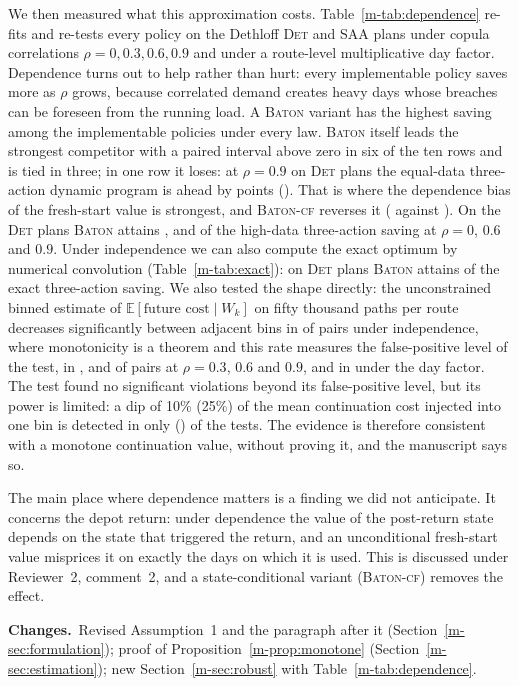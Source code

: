 \documentclass[11pt]{article}
\newcommand{\chg}{\par\noindent\textbf{Changes.}\ }
\newcommand{\sref}[1]{Section~\ref{m-#1}}
\newcommand{\tref}[1]{Table~\ref{m-#1}}
\newcommand{\BATON}{\textsc{Baton}}
\begin{document}
We then measured what this approximation costs. \tref{tab:dependence}
re-fits and re-tests every policy on the Dethloff \textsc{Det} and
\textsc{SAA} plans under copula correlations $\rho = 0, 0.3, 0.6, 0.9$
and under a route-level multiplicative day factor. Dependence turns out
to help rather than hurt: every implementable policy saves more as $\rho$ grows,
because correlated demand creates heavy days whose breaches can be
foreseen from the running load. A \BATON{} variant has the highest
saving among the implementable policies under every law. \BATON{}
itself leads the strongest competitor with a paired interval above zero
in six of the ten rows and is tied in three; in one row it loses: at
$\rho = 0.9$ on \textsc{Det} plans the equal-data three-action dynamic
program is ahead by \depRhoNineDetDelta{} points
(\depRhoNineDetDeltaCI). That is where the dependence bias of the
fresh-start value is strongest, and \textsc{Baton-cf} reverses it
(\depRhoNineDetCf{} against \depRhoNineDetCompSv). On the \textsc{Det}
plans \BATON{} attains \depRhoZeroDetRatio, \depRhoSixDetRatio{} and
\depRhoNineDetRatio{} of the high-data three-action saving at
$\rho = 0$, $0.6$ and $0.9$. Under independence we can also compute the
exact optimum by numerical convolution (\tref{tab:exact}): on
\textsc{Det} plans \BATON{} attains \exDetShare{} of the exact
three-action saving. We also tested the shape directly: the
unconstrained binned estimate of $\mathbb E[\text{future cost}\mid W_k]$
on fifty thousand paths per route decreases significantly between
adjacent bins in \shapeViolZero{} of pairs under independence, where
monotonicity is a theorem and this rate measures the false-positive
level of the test, in \shapeViolThree, \shapeViolSix{} and
\shapeViolNine{} of pairs at $\rho = 0.3$, $0.6$ and $0.9$, and in
\shapeViolDayfac{} under the day factor. The test found no significant
violations beyond its false-positive level, but its power is limited: a
dip of 10\% (25\%) of the mean continuation cost injected into one bin
is detected in only \shapePowTenAll{} (\shapePowTwentyFiveAll) of the
tests. The evidence is therefore consistent with a monotone continuation
value, without proving it, and the manuscript says so.

The main place where dependence matters is a finding we did not
anticipate. It concerns the depot return: under dependence the value of
the post-return state depends on the state that triggered the return,
and an unconditional fresh-start value misprices it on exactly the
days on which it is used. This is discussed under Reviewer~2,
comment~2, and a state-conditional variant (\textsc{Baton-cf}) removes
the effect.
\chg Revised Assumption~1 and the paragraph after it
(\sref{sec:formulation}); proof of Proposition~\ref{m-prop:monotone}
(\sref{sec:estimation}); new \sref{sec:robust} with
\tref{tab:dependence}.
\end{document}
